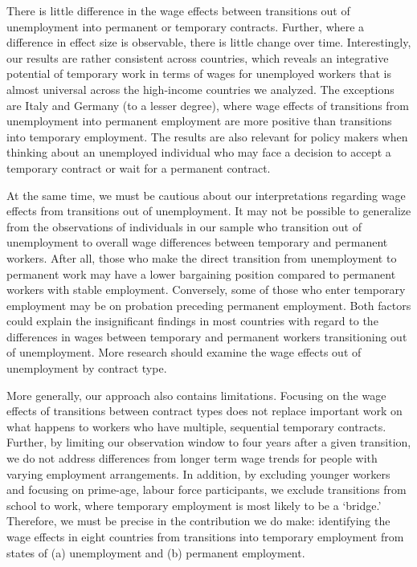 \documentclass[12pt]{article}
\begin{document}
There is little difference in the wage effects between transitions out of unemployment into permanent or temporary contracts.  Further, where a difference in effect size is observable, there is little change over time.  Interestingly, our results are rather consistent across countries, which reveals an integrative potential of temporary work in terms of wages for unemployed workers that is almost universal across the high-income countries we analyzed. The exceptions are Italy and Germany (to a lesser degree), where wage effects of transitions from unemployment into permanent employment are more positive than transitions into temporary employment.  The results are also relevant for policy makers when thinking about an unemployed individual who may face a decision to accept a temporary contract or wait for a permanent contract.  

At the same time, we must be cautious about our interpretations regarding wage effects from transitions out of unemployment.  It may not be possible to generalize from the observations of individuals in our sample who transition out of unemployment to overall wage differences between temporary and permanent workers.  After all, those who make the direct transition from unemployment to permanent work may have a lower bargaining position compared to permanent workers with stable employment. Conversely, some of those who enter temporary employment may be on probation preceding permanent employment.  Both factors could explain the insignificant findings in most countries with regard to the differences in wages between temporary and permanent workers transitioning out of unemployment.  More research should examine the wage effects out of unemployment by contract type.

More generally, our approach also contains limitations.  Focusing on the wage effects of transitions between contract types does not replace important work on what happens to workers who have multiple, sequential temporary contracts.  Further, by limiting our observation window to four years after a given transition, we do not address differences from longer term wage trends for people with varying employment arrangements.  In addition, by excluding younger workers and focusing on prime-age, labour force participants, we exclude transitions from school to work, where temporary employment is most likely to be a `bridge.'  Therefore, we must be precise in the contribution we do make: identifying the wage effects in eight countries from transitions into temporary employment from states of (a) unemployment and (b) permanent employment.
\end{document}
